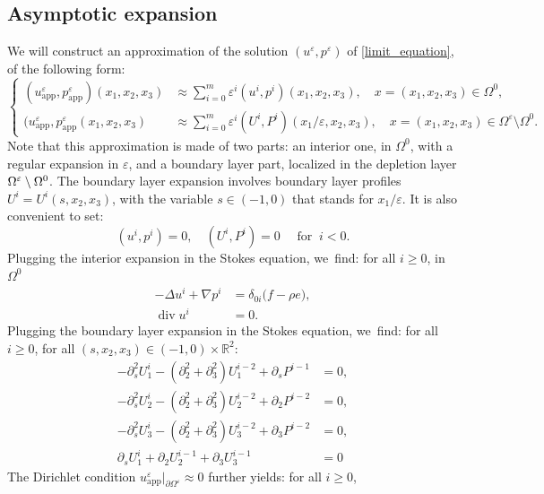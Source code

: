 \documentclass[10pt,a4paper]{amsart}
\newcommand{\app}{\mathrm{app}}
\renewcommand{\div}{\operatorname{div}}
\theoremstyle{plain}
\theoremstyle{definition}
\let\pa\partial
\let\na\nabla
\let\eps\varepsilon
\newcommand{\R}{\mathbb{R}}
\begin{document}
\subsection{Asymptotic expansion}
We will construct an approximation of the solution $(u^\eps,p^\eps)$ of \eqref{limit_equation}, of the following form:
\begin{equation*}
\left\{
\begin{aligned}
(u^\eps_{\app},p^\eps_{\app})(x_1,x_2,x_3) & \approx \sum_{i=0}^m \eps^i (u^i, p^i)(x_1,x_2,x_3), \quad x = (x_1,x_2,x_3) \in \Omega^0, \\
(u^\eps_{\app}, p^\eps_{\app}(x_1,x_2,x_3) & \approx \sum_{i=0}^m \eps^i (U^i, P^i)(x_1/\eps,x_2,x_3), \quad x = (x_1,x_2,x_3) \in \Omega^\eps\setminus\Omega^0.
\end{aligned}
\right.
\end{equation*}
Note that this approximation is made of two parts: an interior one, in $\Omega^0$, with a regular expansion in $\eps$, and a boundary layer part, localized in the depletion layer $\Omega^\eps \setminus\nobreak \Omega^0$. The boundary layer expansion involves boundary layer profiles $U^i = U^i(s,x_2,x_3)$, with the variable $s \in (-1,0)$ that stands for
$x_1/\eps$. It is also convenient to set:
\[
(u^i, p^i)= 0, \quad (U^i, P^i) = 0 \quad \text{ for } \: i < 0.
\]
Plugging the interior expansion in the Stokes equation, we~find: for all $i \ge 0$, in $\Omega^0$
\begin{equation} \label{stokesint}
\begin{aligned}
-\Delta u^i + \na p^i & = \delta_{0i} \big(f - \rho e \big), \\
\div u^i & = 0.
\end{aligned}
\end{equation}
Plugging the boundary layer expansion in the Stokes equation, we~find: for all $i \ge 0$, for all $(s,x_2,x_3) \in (-1,0) \times \R^2$:
\begin{align}
-\pa^2_s U^i_1 - (\pa^2_2 + \pa^2_3) U^{i-2}_1 + \pa_s P^{i-1} & = 0, \label{stokesx} \\
-\pa^2_s U^i_2 - (\pa^2_2 + \pa^2_3) U^{i-2}_2 + \pa_2 P^{i-2} & = 0, \label{stokesy}\\
-\pa^2_s U^i_3 - (\pa^2_2 + \pa^2_3) U^{i-2}_3 + \pa_3 P^{i-2} & = 0, \label{stokesz} \\
\pa_s U^i_1 + \pa_2 U^{i-1}_2 + \pa_3 U^{i-1}_3 & = 0 \label{stokesdiv}
\end{align}
The Dirichlet condition $u^\eps_{\app}\vert_{\pa \Omega^\eps} \approx 0$ further yields: for all $i \ge 0$,
\end{document}
